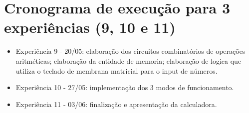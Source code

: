 \documentclass[12pt, a4paper]{article}
\begin{document}
	
	
	\section*{Cronograma de execução para 3 experiências (9, 10 e 11)}
	
	\begin{itemize}
		\item Experiência 9 - 20/05: elaboração dos circuitos combinatórios de operações aritméticas; elaboração da entidade de memoria; 
		elaboração de logica que utiliza o teclado de membrana matricial para o input de números.
		
		\item Experiência 10 - 27/05: implementação dos 3 modos de funcionamento.
		
		\item Experiência 11 - 03/06: finalização e apresentação da calculadora.
	\end{itemize}
	
	
\end{document}
